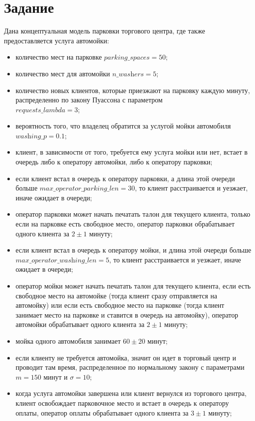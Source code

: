 \documentclass[14pt, a4paper]{extarticle}
\begin{document}


\setcounter{page}{2}

\section{Задание}



Дана концептуальная модель парковки торгового центра, где также предоставляется услуга автомойки: 
\begin{itemize}
	\item количество мест на парковке $\textit{parking\_spaces}=50$;
	\item количество мест для автомойки $\textit{n\_washers}=5$;
	
	\item количество новых клиентов, которые приезжают на парковку каждую минуту, распределенно по закону Пуассона с параметром \\$\textit{requests\_lambda}=3$;
	\item вероятность того, что владелец обратится за услугой мойки автомобиля $\textit{washing\_p}=0.1$;
	\item клиент, в зависимости от того, требуется ему услуга мойки или нет, встает в очередь либо к оператору автомойки, либо к оператору парковки;

	\item если клиент встал в очередь к оператору парковки, а длина этой очереди больше $\textit{max\_operator\_parking\_len}=30$, то клиент расстраивается и уезжает, иначе ожидает в очереди;
	\item оператор парковки может начать печатать талон для текущего клиента, только если на парковке есть свободное место, оператор парковки обрабатывает одного клиента за $2\pm1$ минуту;
	
	\item если клиент встал в очередь к оператору мойки, и длина этой очереди больше $\textit{max\_operator\_washing\_len}=5$, то клиент расстраивается и уезжает, иначе ожидает в очереди;
	\item оператор мойки может начать печатать талон для текущего клиента, если есть свободное место на автомойке (тогда клиент сразу отправляется на автомойку) или если есть свободное место на парковке (тогда клиент занимает место на парковке и ставится в очередь на автомойку), оператор автомойки обрабатывает одного клиента за $2\pm1$ минуту;
	

	\item мойка одного автомобиля занимает $60\pm20$ минут;
	\item если клиенту не требуется автомойка, значит он идет в торговый центр и проводит там время, распределенное по нормальному закону с параметрами $m=150$ минут и $\sigma=10$;
		

	\item когда услуга автомойки завершена или клиент вернулся из торгового центра, клиент освобождает парковочное место и встает в очередь к оператору оплаты, оператор оплаты обрабатывает одного клиента за $3\pm1$ минуту;
	
\end{itemize}
\end{document}
